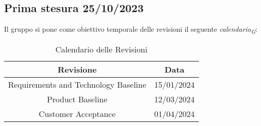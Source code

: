 \subsection{Prima stesura 25/10/2023}
Il gruppo si pone come obiettivo temporale delle revisioni il seguente \textit{calendario}\textsubscript{\textit{G}}:
\begin{table}[ht]
    \centering
    \begin{tabular}{|c|c|}
        \hline
        \textbf{Revisione} & \textbf{Data} \\
        \hline
        Requirements and Technology Baseline & 15/01/2024 \\
        Product Baseline  & 12/03/2024 \\
        Customer Acceptance & 01/04/2024 \\
        \hline
    \end{tabular}
    \caption{Calendario delle Revisioni}
\end{table}
